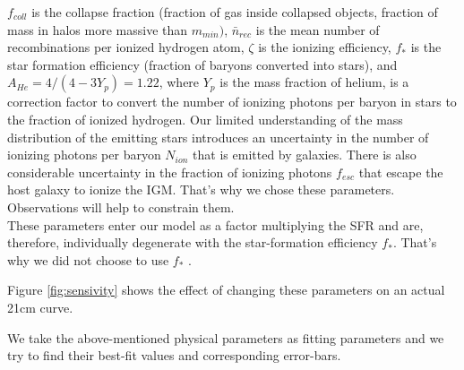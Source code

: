 \documentclass[12pt, TexShade, letterpaper]{report}
\begin{document}
\begin{enumerate}
    $f_{coll}$ is the collapse fraction (fraction of gas inside collapsed objects, fraction of mass in halos more massive than $m_{min})$, $\bar{n}_{rec}$ is the mean number of recombinations per ionized hydrogen atom, $\zeta$ is the ionizing efficiency, $f_*$ is the star formation efficiency (fraction of baryons converted into stars), and $A_{He} = 4/(4 - 3Y_p) = 1.22$, where $Y_p$ is the mass fraction
    of helium, is a correction factor to convert the number of ionizing photons per baryon in stars to the fraction of ionized hydrogen. Our limited understanding of the mass distribution of the emitting stars introduces an uncertainty in the number of ionizing photons per baryon $N_{ion}$ that is emitted by galaxies. There is also considerable uncertainty in the fraction of ionizing photons $f_{esc}$ that escape the host galaxy to ionize the IGM. That's why we chose these parameters. Observations will help to constrain them.\\
    These parameters enter our model as a factor multiplying the SFR and are, therefore, individually degenerate with the star-formation efficiency $f_*$. That's why we did not choose to use $f_*$  \cite{low_frequency, 21century}.
\end{enumerate}
Figure \ref{fig:sensivity} shows the effect of changing these parameters on an actual 21cm curve.\par

We take the above-mentioned physical parameters as fitting parameters and we try to find their best-fit values and corresponding error-bars.\par
\end{document}

